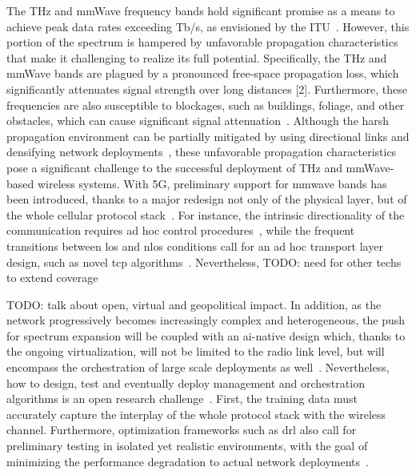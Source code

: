 The THz and mmWave frequency bands hold significant promise as a means to achieve peak data rates exceeding Tb/s, as envisioned by the ITU~\cite{imt2030}. However, this portion of the spectrum is hampered by unfavorable propagation characteristics that make it challenging to realize its full potential.
Specifically, the THz and mmWave bands are plagued by a pronounced free-space propagation loss, which significantly attenuates signal strength over long distances [2]. Furthermore, these frequencies are also susceptible to blockages, such as buildings, foliage, and other obstacles, which can cause significant signal attenuation~\cite{han2018propagation, jornet2011channel}.
Although the harsh propagation environment can be partially mitigated by using directional links and densifying network deployments~\cite{polese2020toward}, these unfavorable propagation characteristics pose a significant challenge to the successful deployment of THz and mmWave-based wireless systems.
With 5G, preliminary support for \gls{mmwave} bands has been introduced, thanks to a major redesign not only of the physical layer, but of the whole cellular protocol stack~\cite{shafi2018microwave}. For instance, the intrinsic directionality of the communication requires ad hoc control procedures~\cite{heng2021six}, while the frequent transitions between \gls{los} and \gls{nlos} conditions call for an ad hoc transport layer design, such as novel \gls{tcp} algorithms~\cite{zhang2019will}. 
Nevertheless, 
TODO: need for other techs to extend coverage


TODO: talk about open, virtual and geopolitical impact.
In addition, as the network progressively becomes increasingly complex and heterogeneous, the push for spectrum expansion will be coupled with an \gls{ai}-native design which, thanks to the ongoing virtualization, will not be limited to the radio link level, but will encompass the orchestration of large scale deployments as well~\cite{polese2023understanding}.
Nevertheless, how to design, test and eventually deploy management and orchestration algorithms is an open research challenge~\cite{polese2022colo}.
First, the training data must accurately capture the interplay of the whole protocol stack with the wireless channel. Furthermore, optimization frameworks such as \gls{drl} also call for preliminary testing in isolated yet realistic environments, with the goal of minimizing the performance degradation to actual network deployments~\cite{lacava2022programmable, amir2023safehaul}.



